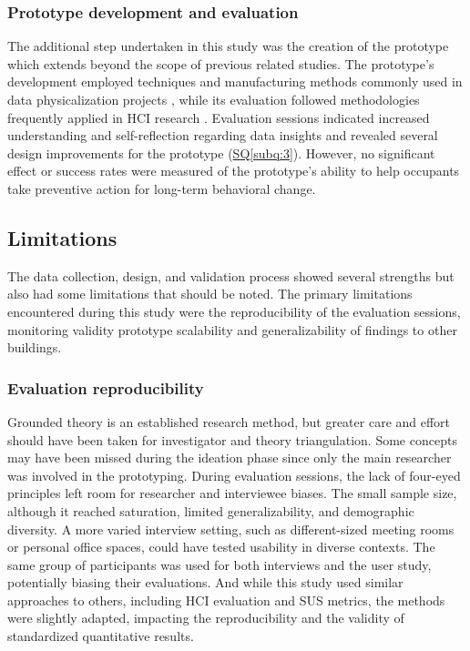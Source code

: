 \subsubsection{Prototype development and evaluation}
The additional step undertaken in this study was the creation of the prototype which extends beyond the scope of previous related studies. The prototype's development employed techniques and manufacturing methods commonly used in data physicalization projects \cite{alexander_data_2019, jansen_opportunities_2015}, while its evaluation followed methodologies frequently applied in HCI research \cite{ranasinghe_encoding_2023, sauve_physecology_2022}. Evaluation sessions indicated increased understanding and self-reflection regarding data insights and revealed several design improvements for the prototype (\hyperref[subq:2]{SQ\ref*{subq:3}}). However, no significant effect or success rates were measured of the prototype's ability to help occupants take preventive action for long-term behavioral change.

\subsection{Limitations}

The data collection, design, and validation process showed several strengths but also had some limitations that should be noted. The primary limitations encountered during this study were the reproducibility of the evaluation sessions, monitoring validity prototype scalability and generalizability of findings to other buildings.

\subsubsection{Evaluation reproducibility}

Grounded theory is an established research method, but greater care and effort should have been taken for investigator and theory triangulation. Some concepts may have been missed during the ideation phase since only the main researcher was involved in the prototyping. During evaluation sessions, the lack of four-eyed principles left room for researcher and interviewee biases. The small sample size, although it reached saturation, limited generalizability, and demographic diversity. A more varied interview setting, such as different-sized meeting rooms or personal office spaces, could have tested usability in diverse contexts. The same group of participants was used for both interviews and the user study, potentially biasing their evaluations. And while this study used similar approaches to others, including HCI evaluation and SUS metrics, the methods were slightly adapted, impacting the reproducibility and the validity of standardized quantitative results. 

